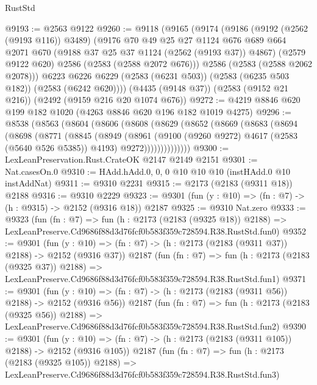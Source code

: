 \begin{lexlean}{RustStd}
\begin{coremodule}
@9193 := @2563 @9122
@9260 := @9118
    (@9165
      (@9174
        (@9186
          (@9192 (@2562 (@9193 @116)) @3489)
          (@9176
            @70
            @49
            @25
            @27
            @1124
            @676
            @689
            @664
            @2071
            @670
            (@9188 @37 @25 @37 @1124 (@2562 (@9193 @37)) @4867)
            (@2579 @9122 @620)
            @2586
            (@2583 (@2588 @2072 @676)))
          @2586
          (@2583 (@2588 @2062 @2078)))
        @6223
        @6226
        @6229
        (@2583 (@6231 @503))
        (@2583 (@6235 @503 @182))
        (@2583 (@6242 @620))))
    (@4435 (@9148 @37))
    (@2583 (@9152 @21 @216))
    (@2492 (@9159 @216 @20 @1074 @676))
@9272 := @4219 @8846 @620 @199 @182 @1020 (@4263 @8846 @620 @196 @182 @1019 @4275)
@9296 := @8538
    (@8563
      (@8604
        (@8606
          (@8608
            (@8629
              (@8652
                (@8669
                  (@8683
                    (@8694
                      (@8698
                        (@8771
                          (@8845
                            (@8949
                              (@8961
                                (@9100 (@9260 @9272) @4617 (@2583 (@5640 @526 @5385)) @4193)
                                @9272))))))))))))))
@9300 := LexLeanPreservation.Rust.CrateOK @2147 @2149 @2151
@9301 := Nat.casesOn.{0}
@9310 := HAdd.hAdd.{0, 0, 0} @10 @10 @10 (instHAdd.{0} @10 instAddNat)
@9311 := @9310 @2231
@9315 := @2173 (@2183 (@9311 @18)) @2188
@9316 := @9310 @2229
@9323 := @9301 (fun (y : @10) => (fn : @7) -> (h : @9315) -> @2152 (@9316 @18)) @2187
@9325 := @9310 Nat.zero
@9333 := @9323
    (fun (fn : @7) =>
    fun (h : @2173 (@2183 (@9325 @18)) @2188) =>
    LexLeanPreserve.Cd9686f88d3d76fcf0b583f359c728594.R38.RustStd.fun0)
@9352 := @9301
    (fun (y : @10) => (fn : @7) -> (h : @2173 (@2183 (@9311 @37)) @2188) -> @2152 (@9316 @37))
    @2187
    (fun (fn : @7) =>
    fun (h : @2173 (@2183 (@9325 @37)) @2188) =>
    LexLeanPreserve.Cd9686f88d3d76fcf0b583f359c728594.R38.RustStd.fun1)
@9371 := @9301
    (fun (y : @10) => (fn : @7) -> (h : @2173 (@2183 (@9311 @56)) @2188) -> @2152 (@9316 @56))
    @2187
    (fun (fn : @7) =>
    fun (h : @2173 (@2183 (@9325 @56)) @2188) =>
    LexLeanPreserve.Cd9686f88d3d76fcf0b583f359c728594.R38.RustStd.fun2)
@9390 := @9301
    (fun (y : @10) => (fn : @7) -> (h : @2173 (@2183 (@9311 @105)) @2188) -> @2152 (@9316 @105))
    @2187
    (fun (fn : @7) =>
    fun (h : @2173 (@2183 (@9325 @105)) @2188) =>
    LexLeanPreserve.Cd9686f88d3d76fcf0b583f359c728594.R38.RustStd.fun3)

\end{coremodule}
\end{lexlean}

